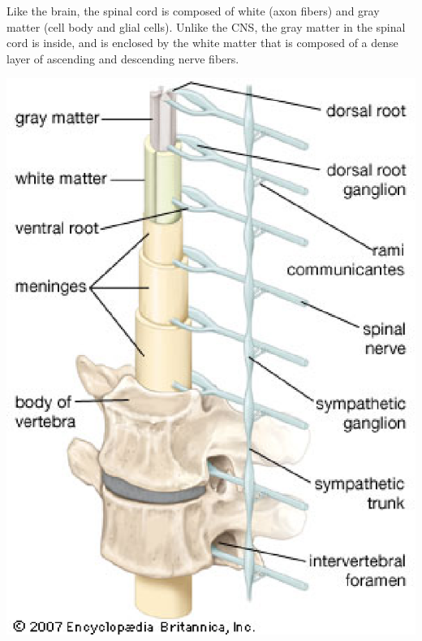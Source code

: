 Like the brain, the spinal cord is composed of white (axon fibers) and gray
matter (cell body and glial cells). Unlike the CNS, the gray matter in the
spinal cord is inside, and is enclosed by the white matter that is composed of a
dense layer of ascending and descending nerve fibers.

\clearpage

\begin{multicols}{2}

{ \centering
 \includegraphics[width=\columnwidth]{./images/spinal_cord_03.eps}\\
 \label{fig:spinal_cord_anatomy} }
\columnbreak


\end{multicols}
